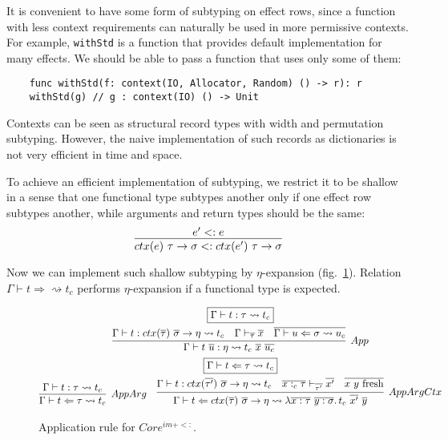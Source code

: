 \documentclass[acmsmall]{acmart}
\newcommand{\mathframebox}[1]{\framebox{$\displaystyle #1$}}
\newcommand{\ap}{~}
\newcommand{\ctx}[1]{ctx(#1)~}
\newcommand{\step}{\rightsquigarrow}
\begin{document}
It is convenient to have some form of subtyping on effect rows, since a function with less context requirements can naturally be used in more permissive contexts.
For example, \texttt{withStd} is a function that provides default implementation for many effects.
We should be able to pass a function that uses only some of them:
\begin{verbatim}
    func withStd(f: context(IO, Allocator, Random) () -> r): r
    withStd(g) // g : context(IO) () -> Unit
\end{verbatim}

Contexts can be seen as structural record types with width and permutation subtyping.
However, the naive implementation of such records as dictionaries is not very efficient in time and space.

To achieve an efficient implementation of subtyping, we restrict it to be shallow in a sense that one functional type subtypes another only if one effect row subtypes another, while arguments and return types should be the same:
\[
    \infer{\ctx{e} \tau \to \sigma <: \ctx{e'} \tau\to\sigma}{e' <: e}
\]

Now we can implement such shallow subtyping by $\eta$-expansion (fig.\ \ref{sig:fim-sub-app}).
Relation $\Gamma\vdash t\Rightarrow \step t_c$ performs $\eta$-expansion if a functional type is expected.

\begin{figure}
    \begin{gather*}
        \mathframebox{\Gamma\vdash t : \tau \step t_c} \\
        \infer[App]{
            \Gamma\vdash t\ap\overline{u} : \eta \step t_c \ap \overline{x} \ap \overline{u_c}
        }{
            \Gamma\vdash t : ctx(\overline{\tau})~\overline{\sigma}\to \eta \step t_c
            &
            \Gamma \vdash_{\overline{\tau}} \overline{x}
            &
            \overline{\Gamma\vdash u \Leftarrow \sigma \step u_c}
        } \\
        \mathframebox{\Gamma\vdash t \Leftarrow \tau \step t_c} \\
        \infer[AppArg]{
            \Gamma\vdash t \Leftarrow \tau \step t_c
        }{
            \Gamma\vdash t : \tau \step t_c
        }
        \text{\hspace{1em}}
        \infer[AppArgCtx]{
            \Gamma \vdash t \Leftarrow ctx(\overline{\tau}) ~\overline{\sigma}\to\eta\step \lambda \overline{x : \tau}~\overline{y : \sigma}\ldotp t_c\ap \overline{x'}\ap\overline{y}
        }{
            \Gamma \vdash t : ctx(\overline{\tau'}) ~\overline{\sigma}\to\eta \step t_c
            &
            \overline{x :_c \tau} \vdash_{\overline{\tau'}} \overline{x'}
            &
            \overline{x~y \text{ fresh}}
        }
    \end{gather*}
    \caption{Application rule for $Core^{im + <:}$.}
    \label{sig:fim-sub-app}
\end{figure}
\end{document}
